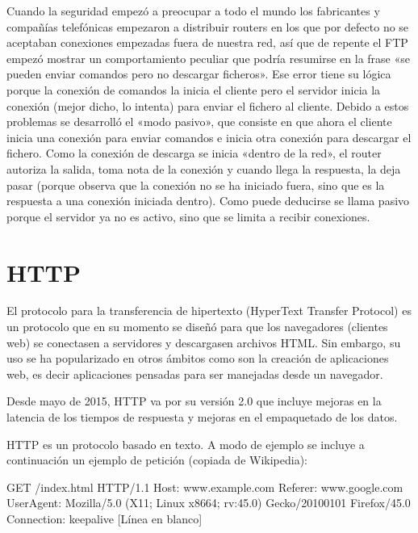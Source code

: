 \documentclass[letterpaper,10pt,spanish]{sphinxmanual}
\begin{document}
Cuando la seguridad empezó a preocupar a todo el mundo los fabricantes y compañías telefónicas empezaron a distribuir routers en los que por defecto no se aceptaban conexiones empezadas fuera de nuestra red, así que de repente el FTP empezó mostrar un comportamiento peculiar que podría resumirse en la frase  «se pueden enviar comandos pero no descargar ficheros». Ese error tiene su lógica porque la conexión de comandos la inicia el cliente pero el servidor inicia la conexión (mejor dicho, lo intenta) para enviar el fichero al cliente. Debido a estos problemas  se desarrolló el  «modo pasivo», que consiste en que ahora el cliente inicia una conexión para enviar comandos e inicia otra conexión para descargar el fichero. Como la conexión de descarga se inicia «dentro de la red», el router autoriza la salida, toma nota de la conexión y cuando llega la respuesta, la deja pasar (porque observa que la conexión no se ha iniciado fuera, sino que es la respuesta a una conexión iniciada dentro). Como puede deducirse se llama pasivo porque el servidor ya no es activo, sino que se limita a recibir conexiones.


\section{HTTP}
\label{\detokenize{textos/tema4:http}}
El protocolo para la transferencia de hipertexto (HyperText Transfer Protocol) es un protocolo que en su momento se diseñó para que los navegadores (clientes web) se conectasen a servidores y descargasen archivos HTML. Sin embargo, su uso se ha popularizado en otros ámbitos como son la creación de aplicaciones web, es decir aplicaciones pensadas para ser manejadas desde un navegador.

Desde mayo de 2015, HTTP va por su versión 2.0 que incluye mejoras en la latencia de los tiempos de respuesta y mejoras en el empaquetado de los datos.

HTTP es un protocolo basado en texto.  A modo de ejemplo se incluye a continuación un ejemplo de petición (copiada de Wikipedia):

%
\begin{sphinxVerbatim}[commandchars=\\\{\}]
GET /index.html HTTP/1.1
Host: www.example.com
Referer: www.google.com
User\PYGZhy{}Agent: Mozilla/5.0 (X11; Linux x86\PYGZus{}64; rv:45.0) Gecko/20100101 Firefox/45.0
Connection: keep\PYGZhy{}alive
[Línea en blanco]
\end{sphinxVerbatim}
\end{document}
